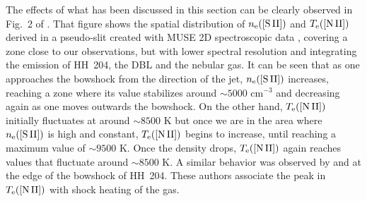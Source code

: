 \documentclass[twocolumn]{aastex63}
\begin{document}
The effects of what has been discussed in this section can be clearly observed in Fig.~2 of \citet{odell17}. That figure shows the spatial distribution of $n_{\rm e}(\text{[S\thinspace II]})$ and $T_{\rm e}(\text{[N\thinspace II]})$ derived in a pseudo-slit created with MUSE 2D spectroscopic data \citep{Weilbacher:2015a}, covering a zone close to our observations, but with lower spectral resolution and integrating the emission of HH~204, the DBL and the nebular gas. It can be seen that as one approaches the bowshock from the direction of the jet, $n_{\rm e}(\text{[S\thinspace II]})$ increases, reaching a zone where its value  stabilizes around $\sim 5000\text{ cm}^{-3}$ and decreasing again as one moves outwards the bowshock. On the other hand, $T_{\rm e}(\text{[N\thinspace II]})$ initially fluctuates at around $\sim 8500\text{ K}$ but once we are in the area where $n_{\rm e}(\text{[S\thinspace II]})$ is high and constant, $T_{\rm e}(\text{[N\thinspace II]})$ begins to increase, until reaching a maximum value of $\sim 9500\text{ K}$. Once the density drops, $T_{\rm e}(\text{[N\thinspace II]})$ again reaches values that fluctuate around $\sim 8500\text{ K}$. A similar behavior was observed by \citet{mesadelgado08} and \citet{nunezdiaz12} at the edge of the bowshock of HH~204. These authors associate the peak in $T_{\rm e}(\text{[N\thinspace II]})$ with shock heating of the gas. 


\end{document}
